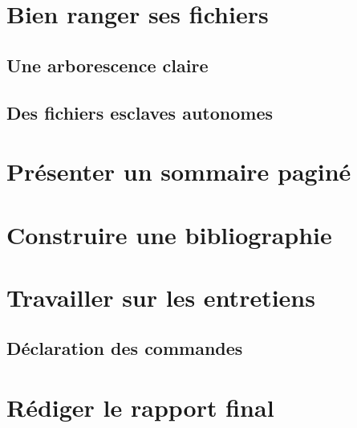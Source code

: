 \documentclass[notitlepage,onecolumn,twoside,12pt,final]{article}
\begin{document}
	\section{Bien ranger ses fichiers}
		\subsection{Une arborescence claire}
		\subsection{Des fichiers esclaves autonomes}
		
	\section{Présenter un sommaire paginé}
	\section{Construire une bibliographie}
	\section{Travailler sur les entretiens}
		\subsection{Déclaration des commandes}
	\section{Rédiger le rapport final}

	\pagebreak
	\printglossaries
	\nocite{*}
	\printbibliography

	\pagebreak
	\tableofcontents
\end{document}
